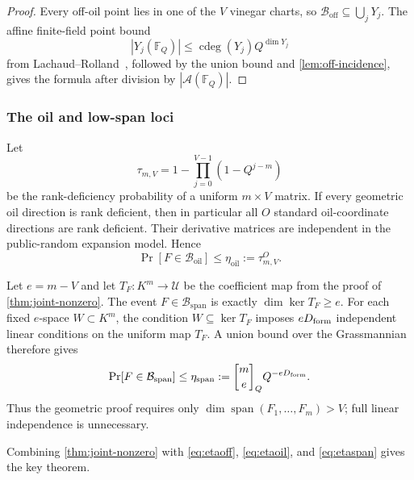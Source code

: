 \documentclass[11pt,a4paper]{article}
\theoremstyle{definition}
\theoremstyle{remark}
\newcommand{\F}{\mathbb F}
\newcommand{\cB}{\mathcal B}
\newcommand{\cU}{\mathcal U}
\newcommand{\Span}{\operatorname{span}}
\newcommand{\cdeg}{\operatorname{cdeg}}
\newcommand{\oil}{\mathrm{oil}}
\newcommand{\off}{\mathrm{off}}
\newcommand{\spanbad}{\mathrm{span}}
\begin{document}
\begin{proof}
Every off-oil point lies in one of the $V$ vinegar charts, so $\cB_{\off}\subseteq\bigcup_jY_j$.  The affine finite-field point bound
\[
|Y_j(\F_Q)|\le\cdeg(Y_j)Q^{\dim Y_j}
\]
from Lachaud--Rolland~\cite{LachaudRolland}, followed by the union bound and \cref{lem:off-incidence}, gives the formula after division by $|\mathcal A(\F_Q)|$.
\end{proof}

\subsubsection{The oil and low-span loci}

Let
\[
\tau_{m,V}=1-\prod_{j=0}^{V-1}(1-Q^{j-m})
\]
be the rank-deficiency probability of a uniform $m\times V$ matrix.  If every geometric oil direction is rank deficient, then in particular all $O$ standard oil-coordinate directions are rank deficient.  Their derivative matrices are independent in the public-random expansion model.  Hence
\begin{equation}\label{eq:etaoil}
\Pr[F\in\cB_{\oil}]\le\eta_{\oil}:=\tau_{m,V}^{O}.
\end{equation}

Let $e=m-V$ and let $T_F:K^m\to\cU$ be the coefficient map from the proof of \cref{thm:joint-nonzero}.  The event $F\in\cB_{\spanbad}$ is exactly $\dim\ker T_F\ge e$.  For each fixed $e$-space $W\subset K^m$, the condition $W\subseteq\ker T_F$ imposes $eD_{\rm form}$ independent linear conditions on the uniform map $T_F$.  A union bound over the Grassmannian therefore gives
\begin{equation}\label{eq:etaspan}
\Pr[F\in\cB_{\spanbad}]
\le
\eta_{\rm span}:=
\genfrac{[}{]}{0pt}{}{m}{e}_Q Q^{-eD_{\rm form}}.
\end{equation}
Thus the geometric proof requires only $\dim\Span(F_1,\ldots,F_m)>V$; full linear independence is unnecessary.

Combining \cref{thm:joint-nonzero} with
\eqref{eq:etaoff}, \eqref{eq:etaoil}, and \eqref{eq:etaspan} gives the key theorem.
\end{document}
